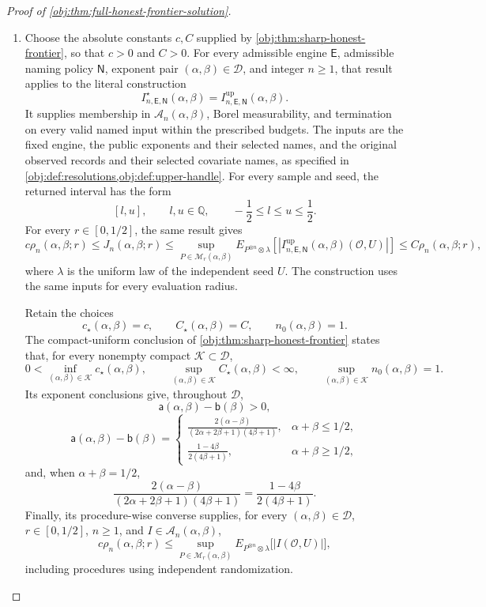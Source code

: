 \begin{proof}[Proof of \cref{obj:thm:full-honest-frontier-solution}]
\begin{enumerate}
\item Choose the absolute constants \(c,C\) supplied by
\cref{obj:thm:sharp-honest-frontier}, so that \(c>0\) and \(C>0\).
For every admissible engine \(\mathsf E\), admissible naming policy
\(\mathsf N\), exponent pair \((\alpha,\beta)\in\mathcal D\), and integer
\(n\ge1\), that result applies to the literal construction
\[
I^\star_{n,\mathsf E,\mathsf N}(\alpha,\beta)
=
I^{\mathrm{up}}_{n,\mathsf E,\mathsf N}(\alpha,\beta).
\]
It supplies membership in \(\mathcal A_n(\alpha,\beta)\), Borel
measurability, and termination on every valid named input within the
prescribed budgets. The inputs are the fixed engine, the public exponents
and their selected names, and the original observed records and their
selected covariate names, as specified in
\cref{obj:def:resolutions,obj:def:upper-handle}. For every sample and seed,
the returned interval has the form
\[
[l,u],\qquad l,u\in\mathbb Q,\qquad
-\frac12\le l\le u\le\frac12.
\]
For every \(r\in[0,1/2]\), the same result gives
\[
c\rho_n(\alpha,\beta;r)
\le J_n(\alpha,\beta;r)
\le
\sup_{P\in\mathcal M_r(\alpha,\beta)}
E_{P^{\otimes n}\otimes\lambda}
\left[
\left|
I^{\mathrm{up}}_{n,\mathsf E,\mathsf N}(\alpha,\beta)
(\mathcal O,U)
\right|
\right]
\le C\rho_n(\alpha,\beta;r),
\]
where \(\lambda\) is the uniform law of the independent seed \(U\).
The construction uses the same inputs for every evaluation radius.

Retain the choices
\[
c_\star(\alpha,\beta)=c,\qquad
C_\star(\alpha,\beta)=C,\qquad
n_0(\alpha,\beta)=1.
\]
The compact-uniform conclusion of
\cref{obj:thm:sharp-honest-frontier} states that, for every nonempty compact
\(\mathcal K\subset\mathcal D\),
\[
0<\inf_{(\alpha,\beta)\in\mathcal K}c_\star(\alpha,\beta),
\qquad
\sup_{(\alpha,\beta)\in\mathcal K}C_\star(\alpha,\beta)<\infty,
\qquad
\sup_{(\alpha,\beta)\in\mathcal K}n_0(\alpha,\beta)=1.
\]
Its exponent conclusions give, throughout \(\mathcal D\),
\[
\mathsf a(\alpha,\beta)-\mathsf b(\beta)>0,
\]
\[
\mathsf a(\alpha,\beta)-\mathsf b(\beta)=
\begin{cases}
\displaystyle
\frac{2(\alpha-\beta)}
{(2\alpha+2\beta+1)(4\beta+1)},
&\alpha+\beta\le1/2,\\[6pt]
\displaystyle
\frac{1-4\beta}{2(4\beta+1)},
&\alpha+\beta\ge1/2,
\end{cases}
\]
and, when \(\alpha+\beta=1/2\),
\[
\frac{2(\alpha-\beta)}
{(2\alpha+2\beta+1)(4\beta+1)}
=
\frac{1-4\beta}{2(4\beta+1)}.
\]
Finally, its procedure-wise converse supplies, for every
\((\alpha,\beta)\in\mathcal D\), \(r\in[0,1/2]\), \(n\ge1\), and
\(I\in\mathcal A_n(\alpha,\beta)\),
\[
c\rho_n(\alpha,\beta;r)
\le
\sup_{P\in\mathcal M_r(\alpha,\beta)}
E_{P^{\otimes n}\otimes\lambda}
\bigl[|I(\mathcal O,U)|\bigr],
\]
including procedures using independent randomization.


\end{enumerate}
\end{proof}
